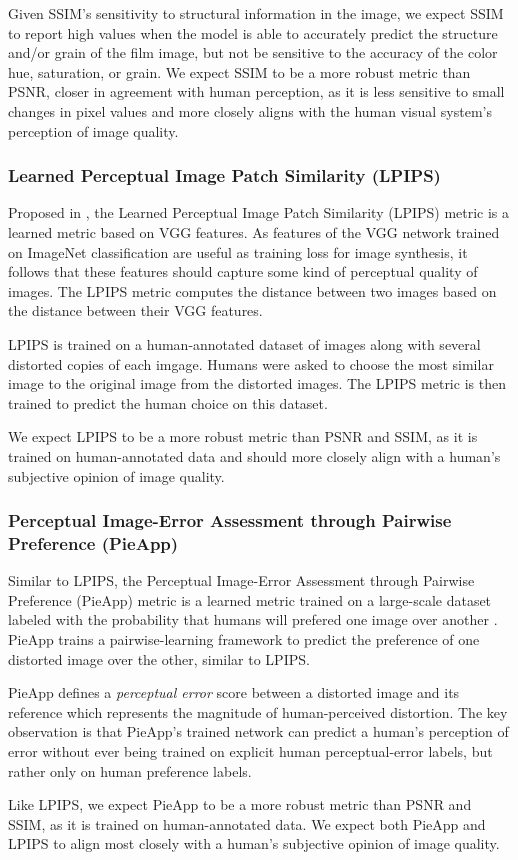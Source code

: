 Given SSIM's sensitivity to structural information in the image, we expect SSIM to report high values when the model is able to accurately predict the structure and/or grain of the film image, but not be sensitive to the accuracy of the color hue, saturation, or grain. We expect SSIM to be a more robust metric than PSNR, closer in agreement with human perception, as it is less sensitive to small changes in pixel values and more closely aligns with the human visual system's perception of image quality.


\subsubsection{Learned Perceptual Image Patch Similarity (LPIPS)}

Proposed in \cite{LPIPS}, the Learned Perceptual Image Patch Similarity (LPIPS) metric is a learned metric based on VGG features. As features of the VGG network trained on ImageNet classification are useful as training loss for image synthesis, it follows that these features should capture some kind of perceptual quality of images. The LPIPS metric computes the distance between two images based on the distance between their VGG features. 

LPIPS is trained on a human-annotated dataset of images along with several distorted copies of each imgage. Humans were asked to choose the most similar image to the original image from the distorted images. The LPIPS metric is then trained to predict the human choice on this dataset.

We expect LPIPS to be a more robust metric than PSNR and SSIM, as it is trained on human-annotated data and should more closely align with a human's subjective opinion of image quality.  


\subsubsection{Perceptual Image-Error Assessment through Pairwise Preference (PieApp)}

Similar to LPIPS, the Perceptual Image-Error Assessment through Pairwise Preference (PieApp) metric is a learned metric trained on a large-scale dataset labeled with the probability that humans will prefered one image over another \cite{PieAPP}. PieApp trains a pairwise-learning framework to predict the preference of one distorted image over the other, similar to LPIPS. 

PieApp defines a \textit{perceptual error} score between a distorted image and its reference which represents the magnitude of human-perceived distortion. The key observation is that PieApp's trained network can predict a human's perception of error without ever being trained on explicit human perceptual-error labels, but rather only on human preference labels.

Like LPIPS, we expect PieApp to be a more robust metric than PSNR and SSIM, as it is trained on human-annotated data. We expect both PieApp and LPIPS to align most closely with a human's subjective opinion of image quality.
